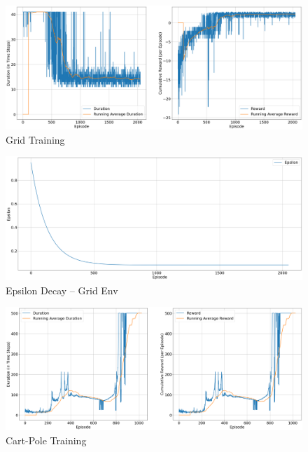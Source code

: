 \documentclass{article} %
\begin{document}
\begin{figure}[H]
    \begin{center}
        \includegraphics[width=\textwidth]{grid_training_ddqn.png}
    \end{center}
    \caption{Grid Training}
\end{figure}

\begin{figure}[H]
    \begin{center}
        \includegraphics[width=\textwidth]{eps_grid_ddqn.png}
    \end{center}
    \caption{Epsilon Decay -- Grid Env}
\end{figure}

\begin{figure}[H]
    \begin{center}
        \includegraphics[width=\textwidth]{cart_training.png}
    \end{center}
    \caption{Cart-Pole Training}
\end{figure}
\end{document}
